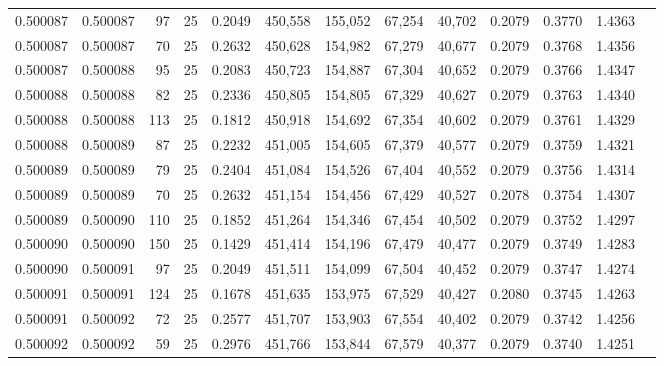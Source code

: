 \begin{tabular}{rrrrrrrrrrrrr}
0.500087 & 0.500087 &  97 &  25 &                                     0.2049 & 450,558 & 155,052 &  67,254 &  40,702 & 0.2079 & 0.3770 & 1.4363 \\
0.500087 & 0.500087 &  70 &  25 &                                     0.2632 & 450,628 & 154,982 &  67,279 &  40,677 & 0.2079 & 0.3768 & 1.4356 \\
0.500087 & 0.500088 &  95 &  25 &                                     0.2083 & 450,723 & 154,887 &  67,304 &  40,652 & 0.2079 & 0.3766 & 1.4347 \\
0.500088 & 0.500088 &  82 &  25 &                                     0.2336 & 450,805 & 154,805 &  67,329 &  40,627 & 0.2079 & 0.3763 & 1.4340 \\
0.500088 & 0.500088 & 113 &  25 &                                     0.1812 & 450,918 & 154,692 &  67,354 &  40,602 & 0.2079 & 0.3761 & 1.4329 \\
0.500088 & 0.500089 &  87 &  25 &                                     0.2232 & 451,005 & 154,605 &  67,379 &  40,577 & 0.2079 & 0.3759 & 1.4321 \\
0.500089 & 0.500089 &  79 &  25 &                                     0.2404 & 451,084 & 154,526 &  67,404 &  40,552 & 0.2079 & 0.3756 & 1.4314 \\
0.500089 & 0.500089 &  70 &  25 &                                     0.2632 & 451,154 & 154,456 &  67,429 &  40,527 & 0.2078 & 0.3754 & 1.4307 \\
0.500089 & 0.500090 & 110 &  25 &                                     0.1852 & 451,264 & 154,346 &  67,454 &  40,502 & 0.2079 & 0.3752 & 1.4297 \\
0.500090 & 0.500090 & 150 &  25 &                                     0.1429 & 451,414 & 154,196 &  67,479 &  40,477 & 0.2079 & 0.3749 & 1.4283 \\
0.500090 & 0.500091 &  97 &  25 &                                     0.2049 & 451,511 & 154,099 &  67,504 &  40,452 & 0.2079 & 0.3747 & 1.4274 \\
0.500091 & 0.500091 & 124 &  25 &                                     0.1678 & 451,635 & 153,975 &  67,529 &  40,427 & 0.2080 & 0.3745 & 1.4263 \\
0.500091 & 0.500092 &  72 &  25 &                                     0.2577 & 451,707 & 153,903 &  67,554 &  40,402 & 0.2079 & 0.3742 & 1.4256 \\
0.500092 & 0.500092 &  59 &  25 &                                     0.2976 & 451,766 & 153,844 &  67,579 &  40,377 & 0.2079 & 0.3740 & 1.4251 \\

\end{tabular}
